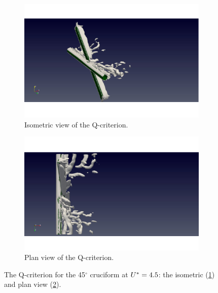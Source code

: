 \documentclass[oneside]{utmthesis}
\begin{document}
\begin{figure}
  \centering
  \begin{subfigure}[h]{0.9\textwidth}
    \includegraphics[width=\textwidth]{figs/qIso045U02}
    \caption{Isometric view of the Q-criterion.}
    \label{fig:qIso045U02}
  \end{subfigure}

  \begin{subfigure}[h]{0.9\textwidth}
    \includegraphics[width=\textwidth]{figs/qTop045U02}
    \caption{Plan view of the Q-criterion.}
    \label{fig:qTop045U02}
  \end{subfigure}

  \caption{The Q-criterion for the 45$^{\circ}$ cruciform at $U^{*} = 4.5$: the isometric (\ref{fig:qIso045U02}) and plan view (\ref{fig:qTop045U02}).} \label{fig:qCrit045U02}
\end{figure}
\end{document}
